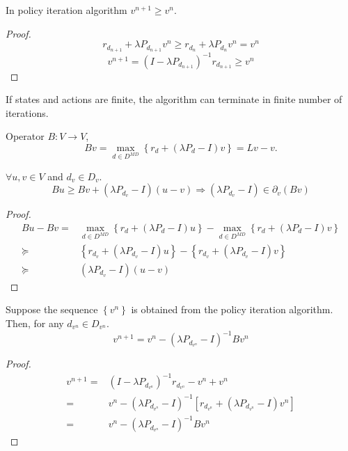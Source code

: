 \begin{proposition}
    In policy iteration algorithm $ v^{n+1} \ge v^{n} $.
    \begin{proof}
        \[
           r_{d_{n+1}} + \lambda P _{d_{n+1}}v^n \ge r_{d_n} + \lambda P_{d_{n}} v^n = v^n   
        \]
        \[
            v^{n+1} = {(I - \lambda P_{d_{n+1}})}^{-1} r_{d_{n+1}} \ge v^{n}
        \]
    \end{proof}
\end{proposition}

If states and actions are finite, the algorithm can terminate in finite number of iterations.

\begin{definition}
    Operator $ B: V \rightarrow V $,
    \[
        Bv = \max_{d\in D^{MD}} \left\{ r_d + (\lambda P_d - I)v \right\} = Lv - v.
    \]
\end{definition}

\begin{proposition}
    $ \forall u,v \in V $ and $ d_v \in D_v $.
    \[
        Bu \ge Bv + (\lambda P_{d_{v}} - I)(u-v) \Rightarrow
        (\lambda P_{d_{v}} - I) \in \partial_{v} (Bv)
    \]
    \begin{proof}
        \begin{align*}
            Bu -Bv =& \max_{d\in D^{MD}} \left\{ r_d + (\lambda P_d - I)u \right\} - \max_{d\in D^{MD}} \left\{ r_d + (\lambda P_d - I)v \right\}\\
            \succeq& \left\{ r_{d_v} + (\lambda P_{d_v} - I)u \right\} - \left\{ r_{d_v} + (\lambda P_{d_v} - I)v \right\}\\
            \succeq& (\lambda P_{d_{v}} - I)(u - v) 
        \end{align*}
    \end{proof}
\end{proposition}

\begin{proposition}
    Suppose the sequence $ \left\{ v^n \right\} $ is obtained from the policy iteration algorithm.
    Then, for any $ d_{v^{n}} \in D _{v^{n}} $.
    \[
        v^{n+1} = v^n - {(\lambda P _{d_{v^{n}}} - I) }^{-1} B v^{n}
    \]
    \begin{proof}
        \begin{align*}
            v^{n+1} =& {(I - \lambda P_{d_{v^n}})}^{-1} r_{d_{v^{n}}} - v^n + v^n\\
            =& v^n - {(\lambda P_{d_{v^n}} - I)}^{-1} \left[ r_{d_{v^{n}}} +  {(\lambda P_{d_{v^n}} - I)}v^n \right]\\
            =& v^n - {(\lambda P _{d_{v^{n}}} - I) }^{-1} B v^{n}
        \end{align*}
    \end{proof}
\end{proposition}

